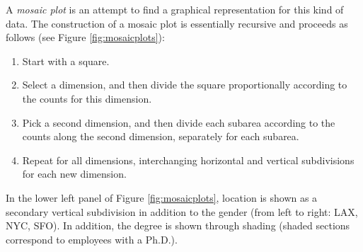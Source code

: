 A \emph{mosaic plot} is an attempt to find a graphical representation
for this kind of data. The construction of a mosaic plot is
essentially recursive and proceeds as follows (see Figure
\ref{fig:mosaicplots}):

\begin{enumerate}
\item Start with a square.
\item Select a dimension, and then divide the square proportionally
  according to the counts for this dimension.
\item Pick a second dimension, and then divide each subarea according
  to the counts along the second dimension, separately for each
  subarea.
\item Repeat for all dimensions, interchanging horizontal and vertical
  subdivisions for each new dimension.
\end{enumerate}

In the lower left panel of Figure \ref{fig:mosaicplots}, location is shown as a secondary vertical subdivision in 
addition to the gender (from left to right: LAX, NYC, SFO). In
addition, the degree is shown through shading (shaded sections
correspond to employees with a Ph.D.).

